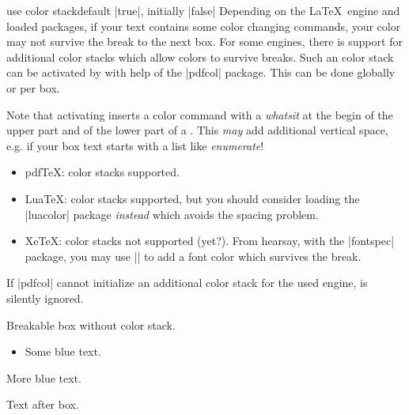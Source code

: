 \begin{docTcbKey}[][doc new=2020-10-09]{use color stack}{}{default |true|, initially |false|}
  Depending on the \LaTeX\ engine and loaded packages, if your text contains some
  color changing commands, your color may not survive the break to the next box.
  For some engines, there is support for additional color stacks which
  allow colors to survive breaks. Such an color stack  can be activated
  by  with help of the |pdfcol| package.
  This can be done globally or per box.
  \begin{marker}
  Note that activating  inserts a color command with a \emph{whatsit}
  at the begin of the upper part and of the lower part of a .
  This \emph{may} add additional vertical space, e.g. if your box text starts
  with a list like \emph{enumerate}!
  \end{marker}
  \begin{itemize}
  \item pdf\TeX: color stacks supported.
  \item Lua\TeX: color stacks supported, but you should consider loading the
     |luacolor| package \emph{instead} which avoids the spacing problem.
  \item Xe\TeX: color stacks not supported (yet?). From hearsay,
    with the |fontspec| package, you may use ||
    to add a font color which survives the break.
  \end{itemize}
  If |pdfcol| cannot initialize an additional color stack for the used engine,
   is silently ignored.

\clearpage
\begin{dispExample}
\begin{multicols}{2}\footnotesize
Breakable box without color stack.
\begin{tcolorbox}[enhanced jigsaw,
  size=small, colframe=gray, colback=yellow!10!white, colupper=blue,
  enforce breakable,%
  vfill before first, pad at break=1mm, break at=3.3cm ]
    \begin{itemize}\item Some blue text.\end{itemize}
    {\color{red}\itshape\lipsum[2]}\par
    More blue text.
\end{tcolorbox}
Text after box.
\end{multicols}
\end{dispExample}


\end{docTcbKey}
